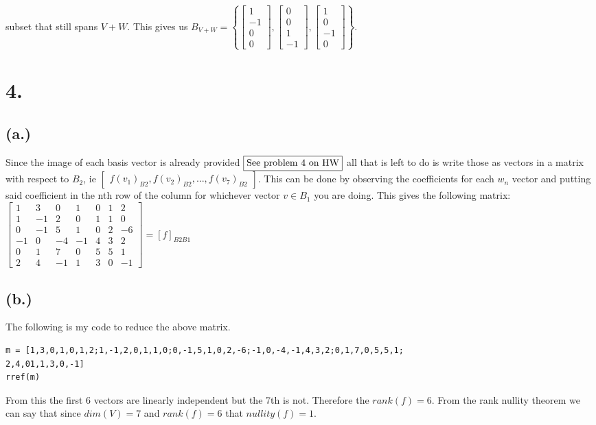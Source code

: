 \documentclass{article}
\begin{document}
subset that still spans $V+W$. This gives us $B_{V+W} = \left \{\begin{bmatrix}1\\-1\\0\\0\end{bmatrix}, \begin{bmatrix}0\\0\\1\\-1\end{bmatrix},\begin{bmatrix}1\\0\\-1\\0\end{bmatrix} \right\}$.

\section*{4.}
	\subsection*{(a.)}
		Since the image of each basis vector is already provided $\fbox{See problem 4 on HW}$ all that is left to do is write those as vectors in a matrix with respect to $B_2$, ie $\begin{bmatrix} f(v_1)_{B2}, f(v_2)_{B2},...,f(v_7)_{B2}\end{bmatrix}$. This can be done by observing the coefficients for each $w_n$ vector and putting said coefficient in the nth row of the column for whichever vector $v \in B_1$ you are doing. This gives the following matrix:
		$\begin{bmatrix}
		1&3&0&1&0&1&2\\
		1&-1&2&0&1&1&0\\
		0&-1&5&1&0&2&-6\\
		-1&0&-4&-1&4&3&2\\
		0&1&7&0&5&5&1\\
		2&4&-1&1&3&0&-1\end{bmatrix} = [f]_{B2B1}$
	\subsection*{(b.)}
		The following is my code to reduce the above matrix.
		\begin{verbatim}
m = [1,3,0,1,0,1,2;1,-1,2,0,1,1,0;0,-1,5,1,0,2,-6;-1,0,-4,-1,4,3,2;0,1,7,0,5,5,1;
2,4,01,1,3,0,-1]
rref(m)
		\end{verbatim}
		From this the first 6 vectors are linearly independent but the 7th is not. Therefore the $rank(f)=6$. From the rank nullity theorem we can say that since $dim(V) = 7$ and $rank(f) = 6$ that $nullity(f) = 1$.
\end{document}
